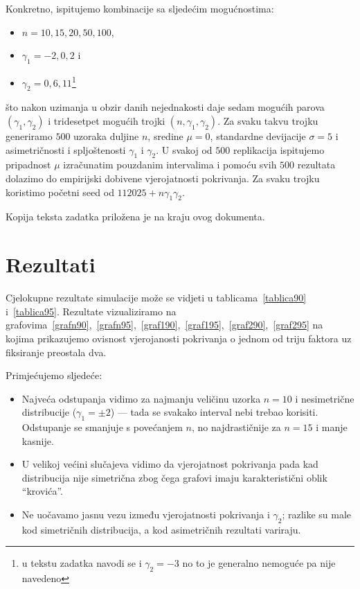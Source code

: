 \documentclass[11pt]{scrartcl}
\begin{document}
Konkretno, ispitujemo kombinacije sa sljedećim mogućnostima:
\begin{itemize}
\item \( n = 10, 15, 20, 50, 100 \),
\item \( \gamma_1 = -2, 0, 2 \) i
\item \( \gamma_2 = 0, 6, 11 \)\footnote{u tekstu zadatka navodi se
	i \( \gamma_2 = -3 \) no to je generalno nemoguće pa nije
		navedeno}
\end{itemize}
što nakon uzimanja u obzir danih nejednakosti daje sedam mogućih parova
\( (\gamma_1, \gamma_2) \) i 
tridesetpet mogućih trojki \( (n, \gamma_1, \gamma_2) \). Za svaku takvu
trojku generiramo \( 500 \) uzoraka duljine \( n \), sredine \( \mu=0 \),
standardne devijacije \( \sigma=5 \) i asimetričnosti i spljoštenosti \( \gamma_1 \) i \( \gamma_2 \).
U svakoj od \( 500 \) replikacija
ispitujemo pripadnost \( \mu \) izračunatim pouzdanim intervalima
i pomoću svih \( 500 \) rezultata dolazimo do empirijski
dobivene vjerojatnosti pokrivanja.
Za svaku trojku koristimo početni seed
od \( 112025 + n\gamma_1\gamma_2 \).

Kopija teksta zadatka priložena je na kraju ovog dokumenta.

\section{Rezultati}
Cjelokupne rezultate simulacije može se vidjeti u tablicama~\ref{tablica90} i~\ref{tablica95}. Rezultate vizualiziramo na grafovima~\ref{grafn90},~\ref{grafn95},~\ref{graf190},~\ref{graf195},~\ref{graf290},~\ref{graf295} na kojima prikazujemo ovisnost vjerojanosti
pokrivanja o jednom od triju faktora
uz fiksiranje preostala dva.

Primjećujemo sljedeće:
\begin{itemize}
	\item Najveća odstupanja vidimo za najmanju veličinu uzorka \( n=10 \) i nesimetrične distribucije (\( \gamma_1 = \pm 2 \)) --- tada se
		svakako interval nebi trebao korisiti. Odstupanje
		se smanjuje s povećanjem \( n \), no najdrastičnije
		za \( n=15 \) i manje kasnije.

	\item U velikoj većini slučajeva vidimo da vjerojatnost
		pokrivanja pada kad distribucija nije simetrična zbog čega grafovi imaju karakteristični oblik \enquote{krovića}.
	\item Ne uočavamo jasnu vezu između vjerojatnosti pokrivanja
		i \( \gamma_2 \); razlike su male kod simetričnih
		distribucija, a kod asimetričnih rezultati variraju.
\end{itemize}
\end{document}
